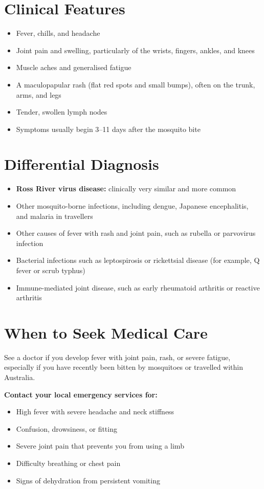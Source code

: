 \section*{Clinical Features}
\begin{itemize}
    \item Fever, chills, and headache
    \item Joint pain and swelling, particularly of the wrists, fingers, ankles, and knees
    \item Muscle aches and generalised fatigue
    \item A maculopapular rash (flat red spots and small bumps), often on the trunk, arms, and legs
    \item Tender, swollen lymph nodes
    \item Symptoms usually begin 3--11 days after the mosquito bite
\end{itemize}

\section*{Differential Diagnosis}
\begin{itemize}
    \item \textbf{Ross River virus disease:} clinically very similar and more common
    \item Other mosquito-borne infections, including dengue, Japanese encephalitis, and malaria in travellers
    \item Other causes of fever with rash and joint pain, such as rubella or parvovirus infection
    \item Bacterial infections such as leptospirosis or rickettsial disease (for example, Q fever or scrub typhus)
    \item Immune-mediated joint disease, such as early rheumatoid arthritis or reactive arthritis
\end{itemize}

\section*{When to Seek Medical Care}
See a doctor if you develop fever with joint pain, rash, or severe fatigue, especially if you have recently been bitten by mosquitoes or travelled within Australia.

\textbf{Contact your local emergency services for:}
\begin{itemize}
    \item High fever with severe headache and neck stiffness
    \item Confusion, drowsiness, or fitting
    \item Severe joint pain that prevents you from using a limb
    \item Difficulty breathing or chest pain
    \item Signs of dehydration from persistent vomiting
\end{itemize}

